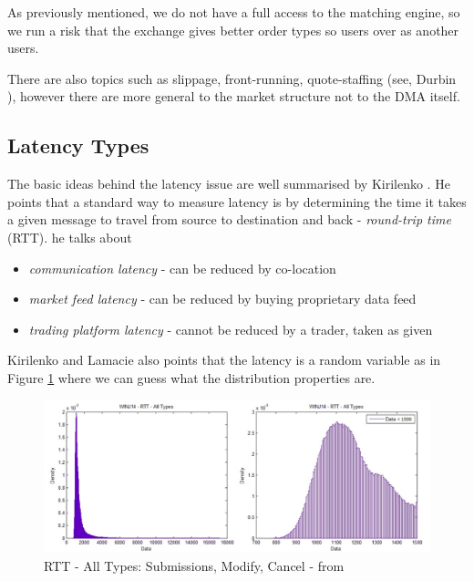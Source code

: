 \documentclass[12pt]{article}
\begin{document}
As previously mentioned, we do not have a full access to the matching engine, so we run a risk that the exchange gives better order types so users over as another users.

There are also topics such as slippage, front-running, quote-staffing (see, Durbin \cite{durbin}), however there are more general to the market structure not to the DMA itself.
\subsection*{Latency Types}
The basic ideas behind the latency issue are well summarised by Kirilenko \cite{kirli1}. He points that a standard way to measure latency is by determining the time it takes a given message to travel from source to destination and back - \textit{round-trip time} (RTT). he talks about
\begin{itemize}
\item \textit{communication latency} - can be reduced by co-location
\item \textit{market feed latency} - can be reduced by buying proprietary data feed
\item \textit{trading platform latency} - cannot be reduced by a trader, taken as given
\end{itemize}
Kirilenko and Lamacie \cite{kirli2} also points that the latency is a random variable as in Figure \ref{fig:latency} where we can guess what the distribution properties are.

\begin{figure}[h!]
	\centering
    \includegraphics[scale=0.27]{latency.png}
    \caption{RTT - All Types: Submissions, Modify, Cancel - from \cite{kirli2}}
    \label{fig:latency}
\end{figure}
\end{document}
